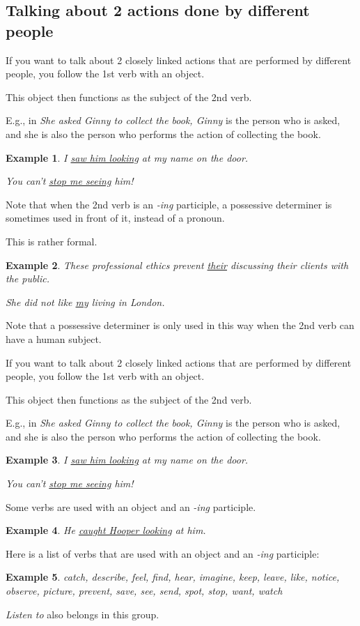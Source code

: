 \documentclass[oneside]{book}
\numberwithin{equation}{section}
\newtheorem{example}{Example}[section]
\begin{document}
\subsection{Talking about 2 actions done by different people}
\noindent{} If you want to talk about 2 closely linked actions that are performed by different people, you follow the 1st verb with an object.

This object then functions as the subject of the 2nd verb.

E.g., in \textit{She asked Ginny to collect the book, Ginny} is the person who is asked, and she is also the person who performs the action of collecting the book.
\begin{example}
    I \underline{saw him looking} at my name on the door.
    
    You can't \underline{stop me seeing} him!
\end{example}
%
\noindent{} Note that when the 2nd verb is an \textit{-ing} participle, a possessive determiner is sometimes used in front of it, instead of a pronoun.

This is rather formal.
\begin{example}
    These professional ethics prevent \underline{their} discussing their clients with the public.
    
    She did not like \underline{my} living in London.
\end{example}
Note that a possessive determiner is only used in this way when the 2nd verb can have a human subject.

%
\noindent{} If you want to talk about 2 closely linked actions that are performed by different people, you follow the 1st verb with an object.

This object then functions as the subject of the 2nd verb.

E.g., in \textit{She asked Ginny to collect the book, Ginny} is the person who is asked, and she is also the person who performs the action of collecting the book.
\begin{example}
    I \underline{saw him looking} at my name on the door.
    
    You can't \underline{stop me seeing} him!
\end{example}
%
\noindent{} Some verbs are used with an object and an \textit{-ing} participle.
\begin{example}
    He \underline{caught Hooper looking} at him.
\end{example}
Here is a list of verbs that are used with an object and an \textit{-ing} participle:
\begin{example}
    catch, describe, feel, find, hear, imagine, keep, leave, like, notice, observe, picture, prevent, save, see, send, spot, stop, want, watch
\end{example}
\textit{Listen to} also belongs in this group.
\end{document}
